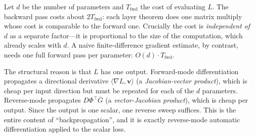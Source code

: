 \begin{remark}
Let $d$ be the number of parameters and $T_{\text{fwd}}$ the cost of evaluating
$L$. The backward pass costs about $2T_{\text{fwd}}$: each layer theorem does
one matrix multiply whose cost is comparable to the forward one. Crucially the
cost is \emph{independent of $d$} as a separate factor---it is proportional to
the size of the computation, which already scales with $d$. A naive
finite-difference gradient estimate, by contrast, needs one full forward pass
per parameter: $O(d)\cdot T_{\text{fwd}}$.

The structural reason is that $L$ has one output. Forward-mode differentiation
propagates a directional derivative $\langle\nabla L,\mathbf{v}\rangle$ (a
\emph{Jacobian-vector product}), which is cheap per input direction but must be
repeated for each of the $d$ parameters. Reverse-mode propagates
$D\Phi^{\!\top}\bar G$ (a \emph{vector-Jacobian product}), which is cheap per
output. Since the output is one scalar, one reverse sweep suffices. This is the
entire content of ``backpropagation'', and it is exactly reverse-mode automatic
differentiation applied to the scalar loss.
\end{remark}

